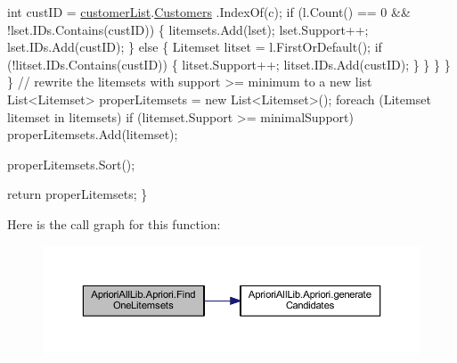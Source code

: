 \begin{DoxyCode}
                        \textcolor{keywordtype}{int} custID = \hyperlink{class_apriori_all_lib_1_1_apriori_abbca8be3761136e76782ce10ebd61638}{customerList}.\hyperlink{class_apriori_all_lib_1_1_customer_list_a4fd2a16a984844e61ffc60b327e6534a}{Customers}
      .IndexOf(c);
                        \textcolor{keywordflow}{if} (l.Count() == 0 && !lset.IDs.Contains(custID))
                        \{
                            litemsets.Add(lset);
                            lset.Support++;
                            lset.IDs.Add(custID);
                        \}
                        \textcolor{keywordflow}{else}
                        \{
                            Litemset litset = l.FirstOrDefault();
                            \textcolor{keywordflow}{if} (!litset.IDs.Contains(custID))
                            \{
                                litset.Support++;
                                litset.IDs.Add(custID);
                            \}
                        \}     
                    \}
                \}
            \}
            \textcolor{comment}{// rewrite the litemsets with support >= minimum to a new list}
            List<Litemset> properLitemsets = \textcolor{keyword}{new} List<Litemset>();
            \textcolor{keywordflow}{foreach} (Litemset litemset \textcolor{keywordflow}{in} litemsets)
                \textcolor{keywordflow}{if} (litemset.Support >= minimalSupport)
                    properLitemsets.Add(litemset);

            properLitemsets.Sort();

            \textcolor{keywordflow}{return} properLitemsets;
        \}
\end{DoxyCode}


Here is the call graph for this function\-:
\nopagebreak
\begin{figure}[H]
\begin{center}
\leavevmode
\includegraphics[width=350pt]{class_apriori_all_lib_1_1_apriori_a64e63d73cfc770ef8532127198b314dd_cgraph}
\end{center}
\end{figure}




